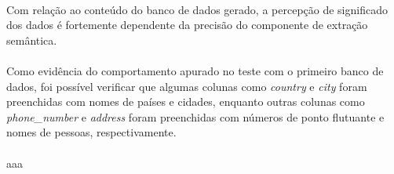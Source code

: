\paragraph{} Com relação ao conteúdo do banco de dados gerado, a percepção de significado dos dados é fortemente dependente da precisão do componente de extração semântica.

\paragraph{} Como evidência do comportamento apurado no teste com o primeiro banco de dados, foi possível verificar que algumas colunas como \textit{country} e \textit{city} foram preenchidas com nomes de países e cidades, enquanto outras colunas como \textit{phone\_number} e \textit{address} foram preenchidas com números de ponto flutuante e nomes de pessoas, respectivamente.

\paragraph{} aaa